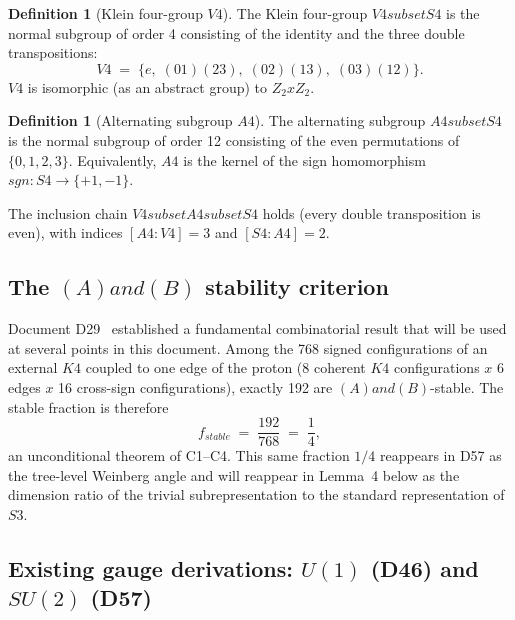 \documentclass[11pt,a4paper]{article}
\def\Sfour{S4}%
\def\Vfour{V4}%
\def\Afour{A4}%
\def\Sthree{S3}%
\def\SUtwo{SU(2)}%
\def\Uone{U(1)}%
\def\Kfour{K4}%
\def\times{x}%
\def\subset{ subset }%
\def\wedge{ and }%
\def\ZZ{Z}%
\def\mathbb#1{#1}%
\def\mathrm#1{#1}%
\theoremstyle{plain}
\theoremstyle{definition}
\newtheorem{definition}[theorem]{Definition}
\theoremstyle{remark}
\newcommand{\Kfour}{K_4}
\newcommand{\Sfour}{S_4}
\newcommand{\Afour}{A_4}
\newcommand{\Vfour}{V_4}
\newcommand{\Sthree}{S_3}
\newcommand{\SUtwo}{\mathrm{SU}(2)}
\newcommand{\Uone}{\mathrm{U}(1)}
\newcommand{\ZZ}{\mathbb{Z}}
\begin{document}
\begin{definition}[Klein four-group $\Vfour$]
\label{def:V4}
The Klein four-group $\Vfour \subset \Sfour$ is the normal subgroup of order 4 consisting of the identity and the three double transpositions:
\[
\Vfour \;=\; \{e,\; (01)(23),\; (02)(13),\; (03)(12)\}.
\]
$\Vfour$ is isomorphic (as an abstract group) to $\ZZ_2 \times \ZZ_2$.
\end{definition}

\begin{definition}[Alternating subgroup $\Afour$]
\label{def:A4}
The alternating subgroup $\Afour \subset \Sfour$ is the normal subgroup of order 12 consisting of the even permutations of $\{0,1,2,3\}$. Equivalently, $\Afour$ is the kernel of the sign homomorphism $\mathrm{sgn}\colon \Sfour \to \{+1,-1\}$.
\end{definition}

The inclusion chain $\Vfour \subset \Afour \subset \Sfour$ holds (every double transposition is even), with indices $[\Afour:\Vfour] = 3$ and $[\Sfour:\Afour] = 2$.

\subsection{The \texorpdfstring{$(A)\wedge(B)$}{(A) and (B)} stability criterion}
\label{subsec:AB}

Document D29~\cite{PDL_D29} established a fundamental combinatorial result that will be used at several points in this document. Among the 768 signed configurations of an external $\Kfour$ coupled to one edge of the proton (8 coherent $\Kfour$ configurations $\times$ 6 edges $\times$ 16 cross-sign configurations), exactly 192 are $(A)\wedge(B)$-stable. The stable fraction is therefore
\begin{equation}
f_{\mathrm{stable}} \;=\; \frac{192}{768} \;=\; \frac{1}{4},
\label{eq:stable_fraction}
\end{equation}
an unconditional theorem of C1--C4. This same fraction $1/4$ reappears in D57 as the tree-level Weinberg angle and will reappear in Lemma~4 below as the dimension ratio of the trivial subrepresentation to the standard representation of $\Sthree$.

\subsection{Existing gauge derivations: \texorpdfstring{$\Uone$}{U(1)} (D46) and \texorpdfstring{$\SUtwo$}{SU(2)} (D57)}
\label{subsec:U1_SU2}
\end{document}
